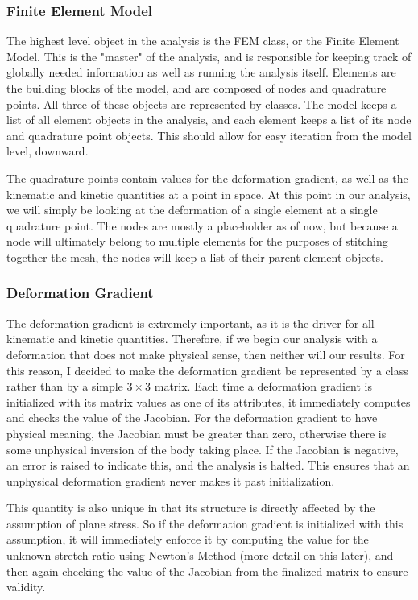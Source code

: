 \documentclass[]{spie}  %
\begin{document}
\subsubsection{Finite Element Model}
The highest level object in the analysis is the FEM class, or the Finite Element Model. This is the "master" of the analysis, and is responsible for keeping track of globally needed information as well as running the analysis itself. Elements are the building blocks of the model, and are composed of nodes and quadrature points. All three of these objects are represented by classes. The model keeps a list of all element objects in the analysis, and each element keeps a list of its node and quadrature point objects. This should allow for easy iteration from the model level, downward. 

The quadrature points contain values for the deformation gradient, as well as the kinematic and kinetic quantities at a point in space. At this point in our analysis, we will simply be looking at the deformation of a single element at a single quadrature point. The nodes are mostly a placeholder as of now, but because a node will ultimately belong to multiple elements for the purposes of stitching together the mesh, the nodes will keep a list of their parent element objects.  

\subsubsection{Deformation Gradient}
The deformation gradient is extremely important, as it is the driver for all kinematic and kinetic quantities. Therefore, if we begin our analysis with a deformation that does not make physical sense, then neither will our results. For this reason, I decided to make the deformation gradient be represented by a class rather than by a simple $3 \times 3$ matrix. Each time a deformation gradient is initialized with its matrix values as one of its attributes, it immediately computes and checks the value of the Jacobian. For the deformation gradient to have physical meaning, the Jacobian must be greater than zero, otherwise there is some unphysical inversion of the body taking place. If the Jacobian is negative, an error is raised to indicate this, and the analysis is halted. This ensures that an unphysical deformation gradient never makes it past initialization. 

This quantity is also unique in that its structure is directly affected by the assumption of plane stress. So if the deformation gradient is initialized with this assumption, it will immediately enforce it by computing the value for the unknown stretch ratio using Newton's Method (more detail on this later), and then again checking the value of the Jacobian from the finalized matrix to ensure validity.
\end{document}
